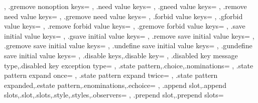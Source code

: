 {{{      \skvremovenonoptionkeys
    },
    .gremove nonoption keys={
      \skvgremovenonoptionkeys
    },
    .need value keys={
      \skvneedvaluekeys
    },
    .gneed value keys={
      \skvgneedvaluekeys
    },
    .remove need value keys={
      \skvremoveneedvaluekeys
    },
    .gremove need value keys={
      \skvgremoveneedvaluekeys
    },
    .forbid value keys={
      \skvforbidvaluekeys
    },
    .gforbid value keys={
      \skvgforbidvaluekeys
    },
    .remove forbid value keys={
      \skvremoveforbidvaluekeys
    },
    .gremove forbid value keys={
      \skvgremoveforbidvaluekeys
    },
    .save initial value keys={
      \skvsaveinitialvaluekeys
    },
    .gsave initial value keys={
      \skvgsaveinitialvaluekeys
    },
    .remove save initial value keys={
      \skvremovesaveinitialvaluekeys
    },
    .gremove save initial value keys={
      \skvgremovesaveinitialvaluekeys
    },
    .undefine save initial value keys={
      \skvundefsaveinitialvaluekeys
    },
    .gundefine save initial value keys={
      \skvgundefsaveinitialvaluekeys
    },
    {.disable keys,.disable key}={
      \skvdisablekeys
    },
    {.disabled key message type,.disabled key exception type}={
    },
    {.state pattern,.choice,.nominations}={
    },
    .state pattern expand once={
    },
    .state pattern expand twice={
    },
    {.state pattern expanded,.estate pattern,.enominations,.echoice}={
    },
    {.append slot,.append slots,.slot,.slots,.style,.styles,.observers}={
    },
    {.prepend slot,.prepend slots}={
}}}
